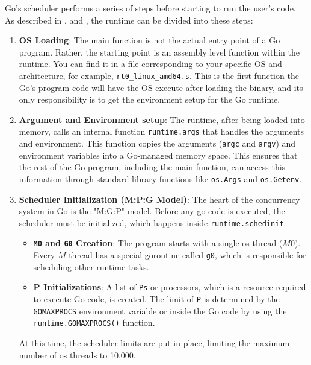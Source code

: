Go's scheduler performs a series of steps before starting to run the user's code. As described in \cite{go:GoLabConf-runtime}, \cite{go:ardanlabs-runtime} and \cite{go:memory-allocation}, the runtime can be divided into these steps:
\begin{enumerate}
    \item \textbf{OS Loading}:
    The main function is not the actual entry point of a Go program. Rather, the starting point is an assembly level function within the runtime. You can find it in a file corresponding to your specific OS and architecture, for example, \texttt{rt0\_linux\_amd64.s}. This is the first function the Go's program code will have the OS execute after loading the binary, and its only responsibility is to get the environment setup for the Go runtime.
        
    \item \textbf{Argument and Environment setup}:
        The runtime, after being loaded into memory, calls an internal function \texttt{runtime.args} that handles the arguments and environment. This function copies the arguments (\texttt{argc} and \texttt{argv}) and environment variables into a Go-managed memory space. This ensures that the rest of the Go program, including the main function, can access this information through standard library functions like \texttt{os.Args} and \texttt{os.Getenv}.
    \item \textbf{Scheduler Initialization (M:P:G Model)}:
        The heart of the concurrency system in Go is the "M:G:P" model. Before any go code is executed, the scheduler must be initialized, which happens inside \texttt{runtime.schedinit}.
        \begin{itemize}
            \item \textbf{\texttt{M0} and \texttt{G0} Creation}: The program starts with a single \gls{os} thread ($M0$). Every $M$ thread has a special \gls{goroutine} called \texttt{g0}, which is responsible for scheduling other runtime tasks.
            \item \textbf{P Initializations}: A list of \texttt{Ps} or processors, which is a resource required to execute Go code, is created. The limit of \texttt{P} is determined by the \texttt{GOMAXPROCS} environment variable or inside the Go code by using the \texttt{runtime.GOMAXPROCS()} function.
        \end{itemize}
        At this time, the scheduler limits are put in place, limiting the maximum number of \gls{os} threads to 10,000.
        

\end{enumerate}
